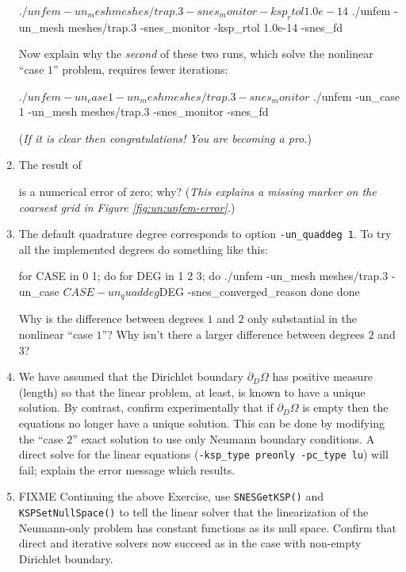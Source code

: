\begin{enumerate}
\begin{cline}
$ ./unfem -un_mesh meshes/trap.3 -snes_monitor -ksp_rtol 1.0e-14
$ ./unfem -un_mesh meshes/trap.3 -snes_monitor -ksp_rtol 1.0e-14 -snes_fd
\end{cline}
Now explain why the \emph{second} of these two runs, which solve the nonlinear ``case $1$'' problem, requires fewer \pSNES iterations:
\begin{cline}
$ ./unfem -un_case 1 -un_mesh meshes/trap.3 -snes_monitor
$ ./unfem -un_case 1 -un_mesh meshes/trap.3 -snes_monitor -snes_fd
\end{cline}
(\emph{If it is clear then congratulations!  You are becoming a \pSNES pro.})
\item The result of
is a numerical error of zero; why?  (\emph{This explains a missing marker on the coarsest grid in Figure \ref{fig:un:unfem-error}.})
\item The default quadrature degree corresponds to option \texttt{-un\_quaddeg 1}.  To try all the implemented degrees do something like this:
\begin{code}
for CASE in 0 1; do
    for DEG in 1 2 3; do
        ./unfem -un_mesh meshes/trap.3 -un_case $CASE -un_quaddeg $DEG -snes_converged_reason
    done
done
\end{code}
Why is the difference between degrees $1$ and $2$ only substantial in the nonlinear ``case $1$''?  Why isn't there a larger difference between degrees $2$ and $3$?
\item \label{exer:un:allneumannfailure}  We have assumed that the Dirichlet boundary $\partial_D \Omega$ has positive measure (length) so that the linear problem, at least, is known to have a unique solution.  By contrast, confirm experimentally that if $\partial_D\Omega$ is empty then the equations no longer have a unique solution.  This can be done by modifying the ``case $2$'' exact solution to use only Neumann boundary conditions.  A direct solve for the linear equations (\texttt{-ksp\_type preonly -pc\_type lu}) will fail; explain the error message which results.
\item \label{exer:un:allneumannresolution}  FIXME Continuing the above Exercise, use \texttt{SNESGetKSP()} and \texttt{KSPSetNullSpace()} to tell the linear solver that the linearization of the Neumann-only problem has constant functions as its null space.  Confirm that direct and iterative solvers now succeed as in the case with non-empty Dirichlet boundary.

\end{enumerate}

